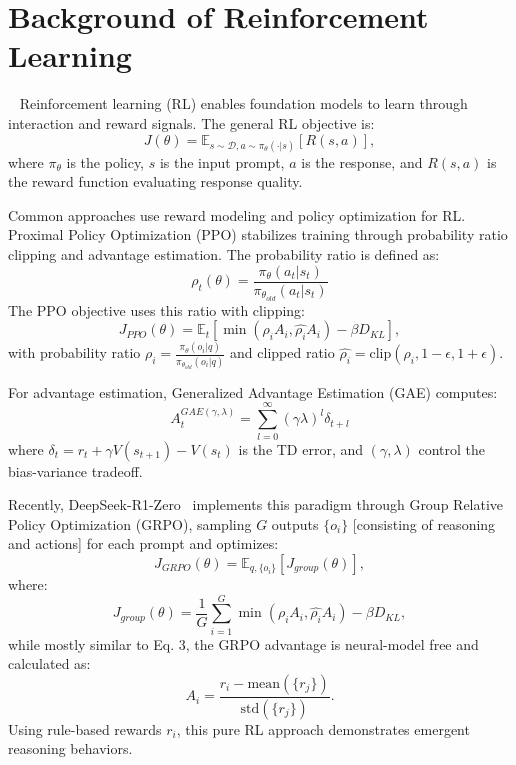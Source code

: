 \section{Background of Reinforcement Learning}
~\label{app:a.rl}
Reinforcement learning (RL) enables foundation models to learn through interaction and reward signals. The general RL objective is:
\begin{equation}
 J(\theta) = \mathbb{E}_{s \sim \mathcal{D}, a \sim \pi_\theta(\cdot|s)}[R(s,a)],   
\end{equation}
where $\pi_\theta$ is the policy, $s$ is the input prompt, $a$ is the response, and $R(s,a)$ is the reward function evaluating response quality. 

Common approaches use reward modeling and policy optimization for RL. Proximal Policy Optimization (PPO) \citep{schulman2017proximalpolicyoptimizationalgorithms} stabilizes training through probability ratio clipping and advantage estimation. The probability ratio is defined as:
\begin{equation}
\rho_t(\theta) = \frac{\pi_\theta(a_t|s_t)}{\pi_{\theta_{old}}(a_t|s_t)}
\end{equation}
The PPO objective uses this ratio with clipping:
\begin{equation}
J_{PPO}(\theta) = \mathbb{E}_t[\min(\rho_iA_i, \hat{\rho_i}A_i) - \beta D_{KL}],
\end{equation}
with probability ratio $\rho_i = \frac{\pi_\theta(o_i|q)}{\pi_{\theta_{old}}(o_i|q)}$ and clipped ratio $\hat{\rho_i} = \text{clip}(\rho_i, 1-\epsilon, 1+\epsilon)$.

For advantage estimation, Generalized Advantage Estimation (GAE) \citep{schulman2018highdimensionalcontinuouscontrolusing} computes:
\begin{equation}
A_t^{GAE(\gamma,\lambda)} = \sum_{l=0}^{\infty}(\gamma\lambda)^l\delta_{t+l}
\end{equation}
where $\delta_t = r_t + \gamma V(s_{t+1}) - V(s_t)$ is the TD error, and $(\gamma,\lambda)$ control the bias-variance tradeoff.


Recently, DeepSeek-R1-Zero~\cite{deepseek1} implements this paradigm through Group Relative Policy Optimization (GRPO), sampling $G$ outputs $\{o_i\}$ [consisting of reasoning and actions] for each prompt and optimizes:
\begin{equation}
J_{GRPO}(\theta) = \mathbb{E}_{q,\{o_i\}}[J_{group}(\theta)],
\end{equation}
where:
\begin{equation}
J_{group}(\theta) = \frac{1}{G}\sum^G_{i=1}\min(\rho_iA_i, \hat{\rho_i}A_i) - \beta D_{KL},
\end{equation}
while mostly similar to Eq. 3, the GRPO advantage is neural-model free and calculated as:
\begin{equation}
A_i = \frac{r_i - \text{mean}(\{r_j\})}{\text{std}(\{r_j\})}.
\end{equation}
Using rule-based rewards $r_i$, this pure RL approach demonstrates emergent reasoning behaviors.


